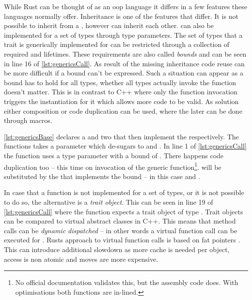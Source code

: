 \documentclass[thesis]{subfiles}
\begin{document}
    While Rust can be thought of as an \gls{oop} language it differs in a few features these languages normally offer.
    Inheritance is one of the features that differ.
    It is not possible to inherit from a \struct, \traits however can inherit each other.
    \traits can also be implemented for a set of types through type parameters.
    The set of types that a trait is generically implemented for can be restricted through a collection of required \traits and lifetimes.
    These requirements are also called \emph{bounds} and can be seen in line 16 of \autoref{lst:genericsCall}.
    As result of the missing inheritance code reuse can be more difficult if a bound can't be expressed.
    Such a situation can appear as a bound has to hold for all types, whether all types actually invoke the function doesn't matter.
    This is in contrast to C++ where only the function invocation triggers the instantiation for it\autocite[§17.8.1 10]{cpp-iso} which allows more code to be valid.
    As solution either composition or code duplication can be used, where the later can be done through macros.
    \autocite[10. Generic Types, Traits, and Lifetimes, 17. Object Oriented Programming Features of Rust]{rust-book}

    \autoref{lst:genericsBase} declares a \trait and two \structs that then implement the \trait respectively.
    The functions  takes a parameter  which de-sugars to  and .
    In line 1 of \autoref{lst:genericsCall} the function  uses a type parameter \T with a bound of .
    There happens code duplication too -- this time on invocation of the generic function\footnote{
      No official documentation validates this, but the assembly code does. With optimisations both functions are in-lined.
    }.
    \T will be substituted by the \struct that implements the bound -- in this case  and .

    In case that a function is not implemented for a set of types, or it is not possible to do so, the alternative is a \emph{trait object}\autocite[17. Object Oriented Programming Features of Rust]{rust-book}.
    This can be seen in line 19 of \autoref{lst:genericsCall} where the function expects a trait object of type .
    Trait objects can be compared to virtual abstract classes in C++.
    This means that method calls can be \emph{dynamic dispatched} -- in other words a virtual function call can be executed for .
    Rusts approach to virtual function calls is based on fat pointers \autocites[std::raw::TraitObject]{rust-doc}[Trait Objects]{rust-book1}.
    This can introduce additional slowdown as more cache is needed per object, access is non atomic\autocite[8.2.3.1 ff.]{intel64and} and moves are more expensive.
\end{document}
